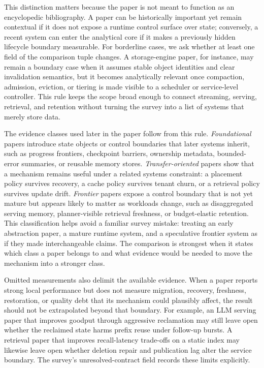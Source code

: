 \documentclass[manuscript,nonacm]{acmart}
\begin{document}
This distinction matters because the paper is not meant to function as an encyclopedic bibliography. A paper can be historically important yet remain contextual if it does not expose a runtime control surface over state; conversely, a recent system can enter the analytical core if it makes a previously hidden lifecycle boundary measurable. For borderline cases, we ask whether at least one field of the comparison tuple changes. A storage-engine paper, for instance, may remain a boundary case when it assumes stable object identities and clear invalidation semantics, but it becomes analytically relevant once compaction, admission, eviction, or tiering is made visible to a scheduler or service-level controller. This rule keeps the scope broad enough to connect streaming, serving, retrieval, and retention without turning the survey into a list of systems that merely store data.

The evidence classes used later in the paper follow from this rule. \emph{Foundational} papers introduce state objects or control boundaries that later systems inherit, such as progress frontiers, checkpoint barriers, ownership metadata, bounded-error summaries, or reusable memory stores. \emph{Transfer-oriented} papers show that a mechanism remains useful under a related systems constraint: a placement policy survives recovery, a cache policy survives tenant churn, or a retrieval policy survives update drift. \emph{Frontier} papers expose a control boundary that is not yet mature but appears likely to matter as workloads change, such as disaggregated serving memory, planner-visible retrieval freshness, or budget-elastic retention. This classification helps avoid a familiar survey mistake: treating an early abstraction paper, a mature runtime system, and a speculative frontier system as if they made interchangeable claims. The comparison is strongest when it states which class a paper belongs to and what evidence would be needed to move the mechanism into a stronger class.

Omitted measurements also delimit the available evidence. When a paper reports strong local performance but does not measure migration, recovery, freshness, restoration, or quality debt that its mechanism could plausibly affect, the result should not be extrapolated beyond that boundary. For example, an LLM serving paper that improves goodput through aggressive reclamation may still leave open whether the reclaimed state harms prefix reuse under follow-up bursts. A retrieval paper that improves recall-latency trade-offs on a static index may likewise leave open whether deletion repair and publication lag alter the service boundary. The survey's unresolved-contract field records these limits explicitly.
\end{document}
